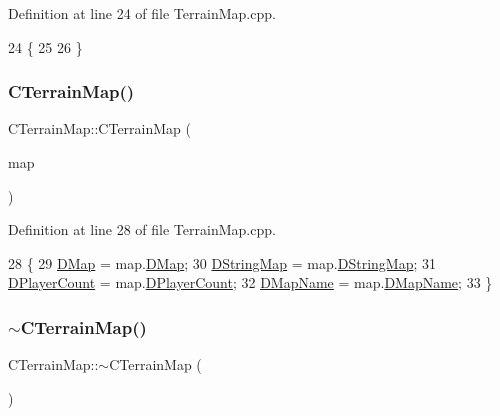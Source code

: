 Definition at line 24 of file Terrain\+Map.\+cpp.


\begin{DoxyCode}
24                         \{
25 
26 \}
\end{DoxyCode}
\hypertarget{classCTerrainMap_a9c98a824cf26ee35735a632472ca7ffd}{}\label{classCTerrainMap_a9c98a824cf26ee35735a632472ca7ffd} 
\subsubsection{\texorpdfstring{C\+Terrain\+Map()}{CTerrainMap()}\hspace{0.1cm}{\footnotesize\ttfamily [2/2]}}
{\footnotesize\ttfamily C\+Terrain\+Map\+::\+C\+Terrain\+Map (\begin{DoxyParamCaption}\item[{const \hyperlink{classCTerrainMap}{C\+Terrain\+Map} \&}]{map }\end{DoxyParamCaption})}



Definition at line 28 of file Terrain\+Map.\+cpp.


\begin{DoxyCode}
28                                               \{
29     \hyperlink{classCTerrainMap_a80d154ce478948b10473534a7bca13f6}{DMap} = map.\hyperlink{classCTerrainMap_a80d154ce478948b10473534a7bca13f6}{DMap};
30     \hyperlink{classCTerrainMap_a76db5fd05e22e0aea413f49175f9c282}{DStringMap} = map.\hyperlink{classCTerrainMap_a76db5fd05e22e0aea413f49175f9c282}{DStringMap};
31     \hyperlink{classCTerrainMap_a79e2cf566ac9dfbaddd2c73ea256785b}{DPlayerCount} = map.\hyperlink{classCTerrainMap_a79e2cf566ac9dfbaddd2c73ea256785b}{DPlayerCount};
32     \hyperlink{classCTerrainMap_a9026e4a5f073885b9e9fc3b43e93caa6}{DMapName} = map.\hyperlink{classCTerrainMap_a9026e4a5f073885b9e9fc3b43e93caa6}{DMapName};
33 \}
\end{DoxyCode}
\hypertarget{classCTerrainMap_a7e7b02ec0a42ca686fc895d0923567b3}{}\label{classCTerrainMap_a7e7b02ec0a42ca686fc895d0923567b3} 
\subsubsection{\texorpdfstring{$\sim$\+C\+Terrain\+Map()}{~CTerrainMap()}}
{\footnotesize\ttfamily C\+Terrain\+Map\+::$\sim$\+C\+Terrain\+Map (\begin{DoxyParamCaption}{ }\end{DoxyParamCaption})}



